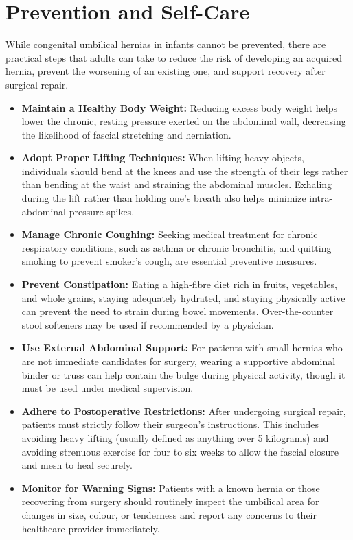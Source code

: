 \section*{Prevention and Self-Care}
While congenital umbilical hernias in infants cannot be prevented, there are practical steps that adults can take to reduce the risk of developing an acquired hernia, prevent the worsening of an existing one, and support recovery after surgical repair.
\begin{itemize}
    \item \textbf{Maintain a Healthy Body Weight:} Reducing excess body weight helps lower the chronic, resting pressure exerted on the abdominal wall, decreasing the likelihood of fascial stretching and herniation.
    \item \textbf{Adopt Proper Lifting Techniques:} When lifting heavy objects, individuals should bend at the knees and use the strength of their legs rather than bending at the waist and straining the abdominal muscles. Exhaling during the lift rather than holding one's breath also helps minimize intra-abdominal pressure spikes.
    \item \textbf{Manage Chronic Coughing:} Seeking medical treatment for chronic respiratory conditions, such as asthma or chronic bronchitis, and quitting smoking to prevent smoker's cough, are essential preventive measures.
    \item \textbf{Prevent Constipation:} Eating a high-fibre diet rich in fruits, vegetables, and whole grains, staying adequately hydrated, and staying physically active can prevent the need to strain during bowel movements. Over-the-counter stool softeners may be used if recommended by a physician.
    \item \textbf{Use External Abdominal Support:} For patients with small hernias who are not immediate candidates for surgery, wearing a supportive abdominal binder or truss can help contain the bulge during physical activity, though it must be used under medical supervision.
    \item \textbf{Adhere to Postoperative Restrictions:} After undergoing surgical repair, patients must strictly follow their surgeon's instructions. This includes avoiding heavy lifting (usually defined as anything over 5 kilograms) and avoiding strenuous exercise for four to six weeks to allow the fascial closure and mesh to heal securely.
    \item \textbf{Monitor for Warning Signs:} Patients with a known hernia or those recovering from surgery should routinely inspect the umbilical area for changes in size, colour, or tenderness and report any concerns to their healthcare provider immediately.
\end{itemize}

